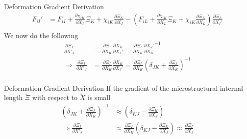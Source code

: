 \documentclass[11pt]{beamer}
\newcommand{\VEC}[1]{\utilde{#1}}
\begin{document}
\begin{frame}{Deformation Gradient Derivation}
\begin{align*}
F_{iI}' &= F_{iI} + \frac{\partial \chi_{iK}}{\partial X_I} \Xi_K + \chi_{iK}\frac{\partial \Xi_K}{\partial X_I} - \left(F_{iL} + \frac{\partial \chi_{iK}}{\partial X_L}\Xi_{K} + \chi_{iK} \frac{\partial \Xi_K}{\partial X_L}\right)\frac{\partial \Xi_L}{\partial X_I'}\\
\end{align*}
We now do the following
\begin{align*}
\frac{\partial \Xi_I}{\partial X'_J} &= \frac{\partial \Xi_I}{\partial X_K} \frac{\partial X_K}{\partial X_J'} = \frac{\partial \Xi_I}{\partial X_K} \frac{\partial X_J'}{\partial X_K}^{-1}\\
\Rightarrow\ \frac{\partial \Xi_I}{\partial X'_J} &= \frac{\partial \Xi_I}{\partial X_K} \frac{\partial X_K}{\partial X_J'} = \frac{\partial \Xi_I}{\partial X_K} \left( \delta_{JK} + \frac{\partial \Xi_J}{\partial X_K}\right)^{-1}\\
\end{align*}
\end{frame}

\begin{frame}{Deformation Gradient Derivation}
If the gradient of the microstructural internal length $\VEC{\Xi}$ with respect to $\VEC{X}$ is small
\begin{align*}
\left( \delta_{JK} + \frac{\partial \Xi_J}{\partial X_K}\right)^{-1} &\approx \left( \delta_{KJ} - \frac{\partial \Xi_K}{\partial X_J}\right)\\
\Rightarrow\frac{\partial \Xi_I}{\partial X'_J} &\approx \frac{\partial \Xi_I}{\partial X_K} \left( \delta_{KJ} - \frac{\partial \Xi_K}{\partial X_J}\right) \approx \frac{\partial \Xi_I}{\partial X_J}\\
\end{align*}

\end{frame}
\end{document}
